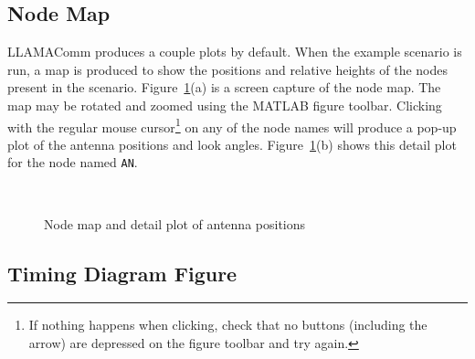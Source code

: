 \subsection{Node Map}

LLAMAComm produces a couple plots by default.  When the example
scenario is run, a map is produced to show the positions and
relative heights of the nodes present in the scenario.
Figure~\ref{fig:nodeMap}(a) is a screen capture of the node map. The
map may be rotated and zoomed using the MATLAB figure toolbar.
Clicking with the regular mouse cursor\footnote{If nothing happens
when clicking, check that no buttons (including the arrow) are
depressed on the figure toolbar and try again.} on any of the node
names will produce a pop-up plot of the antenna positions and look
angles. Figure~\ref{fig:nodeMap}(b) shows this detail plot for the
node named \verb+AN+.

\begin{figure}[h]
\centering \mbox{
     \quad
} \caption{Node map and detail plot of antenna positions}
\label{fig:nodeMap}
\end{figure}


\subsection{Timing Diagram Figure}\label{sec:tdSec}

